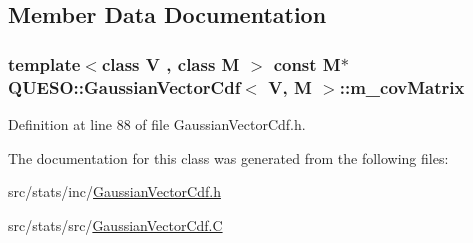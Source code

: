 \subsection{Member Data Documentation}
\hypertarget{class_q_u_e_s_o_1_1_gaussian_vector_cdf_a0b00fdc02b3e15cd81d215d5c01bbd1f}{
\subsubsection[{m\-\_\-cov\-Matrix}]{\setlength{\rightskip}{0pt plus 5cm}template$<$class V , class M $>$ const M$\ast$ {\bf Q\-U\-E\-S\-O\-::\-Gaussian\-Vector\-Cdf}$<$ V, M $>$\-::m\-\_\-cov\-Matrix\hspace{0.3cm}{\ttfamily [protected]}}}\label{class_q_u_e_s_o_1_1_gaussian_vector_cdf_a0b00fdc02b3e15cd81d215d5c01bbd1f}


Definition at line 88 of file Gaussian\-Vector\-Cdf.\-h.



The documentation for this class was generated from the following files\-:\begin{DoxyCompactItemize}
\item 
src/stats/inc/\hyperlink{_gaussian_vector_cdf_8h}{Gaussian\-Vector\-Cdf.\-h}\item 
src/stats/src/\hyperlink{_gaussian_vector_cdf_8_c}{Gaussian\-Vector\-Cdf.\-C}\end{DoxyCompactItemize}
